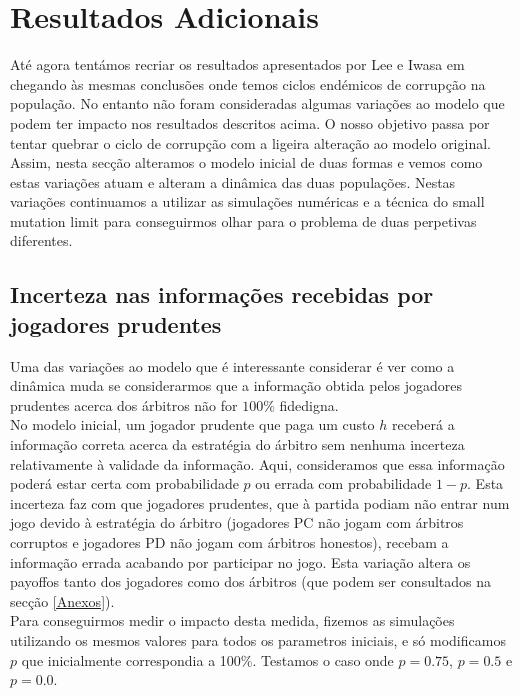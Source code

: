 \documentclass[conference, twocolumn]{IEEEtran}
\theoremstyle{plain}
\theoremstyle{definition}
\theoremstyle{remark}
\begin{document}
    \section{Resultados Adicionais}
    Até agora tentámos recriar os resultados apresentados por Lee e Iwasa em \cite{1} chegando às mesmas conclusões onde temos ciclos endémicos de corrupção na população. No entanto não foram consideradas algumas variações ao modelo que podem ter impacto nos resultados descritos acima. O nosso objetivo passa por tentar quebrar o ciclo de corrupção com a ligeira alteração ao modelo original.
    Assim, nesta secção alteramos o modelo inicial de duas formas e vemos como estas variações atuam e alteram a dinâmica das duas populações.
    Nestas variações continuamos a utilizar as simulações numéricas e a técnica do small mutation limit para conseguirmos olhar para o problema de duas perpetivas diferentes.

    \subsection{Incerteza nas informações recebidas por jogadores prudentes}
    Uma das variações ao modelo que é interessante considerar é ver como a dinâmica muda se considerarmos que a informação obtida pelos jogadores prudentes acerca dos árbitros não for $100\%$  fidedigna.\\
    No modelo inicial, um jogador prudente que paga um custo $h$ receberá a informação correta acerca da estratégia do árbitro sem nenhuma incerteza relativamente à validade da informação. Aqui, consideramos que essa informação poderá estar certa com probabilidade $p$ ou errada com probabilidade $1-p$. Esta incerteza faz com que jogadores prudentes, que à partida podiam não entrar num jogo devido à estratégia do árbitro (jogadores PC não jogam com árbitros corruptos e jogadores PD não jogam com árbitros honestos), recebam a informação errada acabando por participar no jogo. Esta variação altera os payoffos tanto dos jogadores como dos árbitros (que podem ser consultados na secção \ref{Anexos}).\\

    Para conseguirmos medir o impacto desta medida, fizemos as simulações utilizando os mesmos valores para todos os parametros iniciais, e só modificamos $p$ que inicialmente correspondia a 100\%. Testamos o caso onde $p=0.75$, $p=0.5$ e $p=0.0$.
    \\
\end{document}
